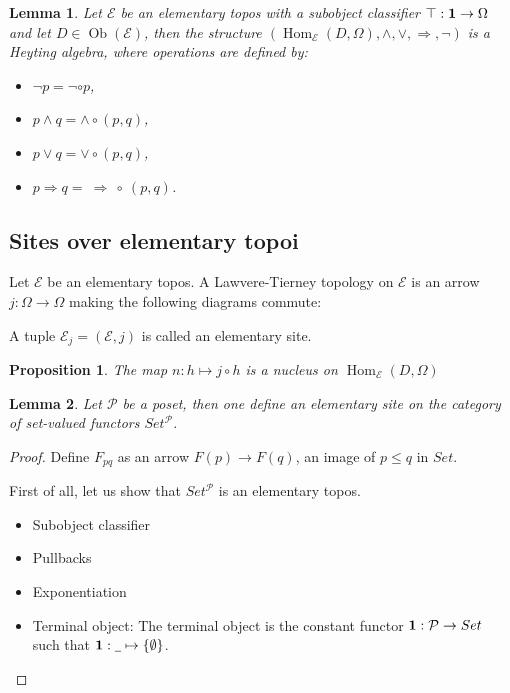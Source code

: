 \documentclass[a4paper]{article}
\theoremstyle{defin}
\theoremstyle{theorem}
\theoremstyle{claim}
\theoremstyle{prop}
\newtheorem{prop}{Proposition}
\theoremstyle{lemma}
\newtheorem{lemma}{Lemma}
\theoremstyle{fact}
\theoremstyle{ex}
\theoremstyle{col}
\begin{document}
\begin{lemma}
Let $\mathcal{E}$ be an elementary topos with a subobject classifier $\top : {\bf 1} \to \Omega$ and let $D \in \operatorname{Ob}(\mathcal{E})$, then the structure $(\operatorname{Hom}_{\mathcal{E}}(D, \Omega), \wedge, \vee, \Rightarrow, \neg)$ is a Heyting algebra, where operations are defined by:

\begin{itemize}
\item $\neg p = \neg \circ p$,
\item $p \wedge q = \wedge \circ (p, q)$,
\item $p \vee q = \vee \circ (p, q)$,
\item $p \Rightarrow q = \: \Rightarrow \: \circ \: (p, q)$.
\end{itemize}
\end{lemma}

\subsection{Sites over elementary topoi}

Let $\mathcal{E}$ be an elementary topos. A Lawvere-Tierney topology on $\mathcal{E}$ is an arrow $j : \Omega \to \Omega$ making the following diagrams commute:

\centerline{
}

A tuple $\mathcal{E}_j = (\mathcal{E}, j)$ is called an elementary site.

\begin{prop}
The map $n : h \mapsto j \circ h$ is a nucleus on $\operatorname{Hom}_\mathcal{E}(D, \Omega)$
\end{prop}

\begin{lemma}
Let $\mathcal{P}$ be a poset, then one define an elementary site on the category of set-valued functors $Set^{\mathcal{P}}$.
\end{lemma}

\begin{proof}
Define $F_{pq}$ as an arrow $F(p) \to F(q)$, an image of $p \leq q$ in $Set$.

First of all, let us show that $Set^{\mathcal{P}}$ is an elementary topos.
\begin{itemize}
\item Subobject classifier
\item Pullbacks
\item Exponentiation
\item Terminal object:
The terminal object is the constant functor ${\bf 1 } : \mathcal{P} \to Set$ such that ${\bf 1} : \underline{\:\:} \mapsto \{ \emptyset \}$.
\end{itemize}
\end{proof}
\end{document}
